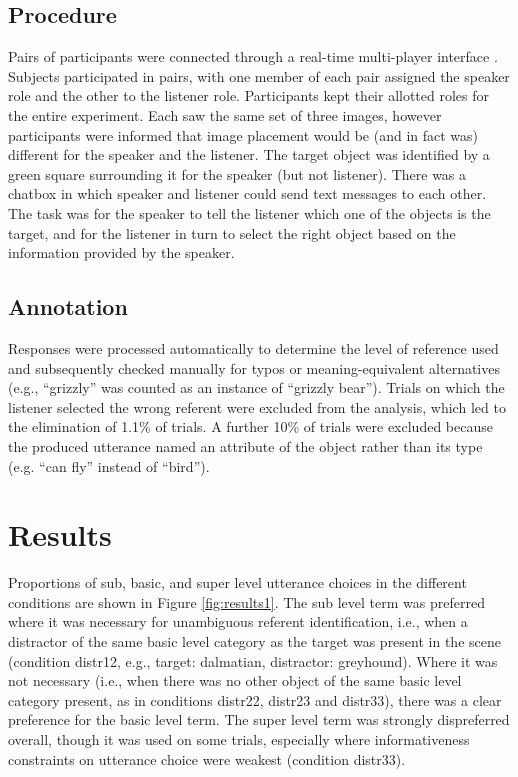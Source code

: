 \documentclass[10pt,letterpaper]{article}
\newcommand{\ndg}[1]{\textcolor{Green}{[ndg: #1]}}
\newcommand{\figref}[1]{Figure \ref{#1}}
\begin{document}
\subsection{\bf Procedure}
Pairs of participants were connected through a real-time multi-player interface \cite{Hawkins15_RealTimeWebExperiments}. Subjects participated in pairs, with one member of each pair assigned the speaker role and the other to the listener role. Participants kept their allotted roles for the entire experiment. 
Each saw the same set of three images, however participants were informed that image placement would be (and in fact was) different for the speaker and the listener. The target object was identified by a green square surrounding it for the speaker (but not listener). There was a chatbox in which speaker and listener could send text messages to each other. The task was for the speaker to tell the listener which one of the objects is the target, and for the listener in turn to select the right object based on the information provided by the speaker. 

\subsection{\bf Annotation}
Responses were processed automatically to determine the level of reference used and subsequently checked manually for typos or meaning-equivalent alternatives (e.g., ``grizzly'' was counted as an instance of ``grizzly bear''). 
Trials on which the listener selected the wrong referent were excluded from the analysis, which led to the elimination of 1.1\% of trials. A further 10\% of trials were excluded because  the produced utterance named an attribute of the object rather than its type (e.g. ``can fly'' instead of ``bird'').

\section{\bf Results}

Proportions of sub, basic, and super level utterance choices in the different conditions are shown in \figref{fig:results1}. The sub level term was preferred where it was necessary for unambiguous referent identification, i.e., when a distractor of the same basic level category as the target was present in the scene (condition distr12, e.g., target: dalmatian, distractor: greyhound). Where it was not necessary (i.e., when there was no other object of the same basic level category present, as in conditions distr22, distr23 and distr33), there was a clear preference for the basic level term. The super level term was strongly dispreferred overall, though it was used on some trials, especially where informativeness constraints on utterance choice were weakest (condition distr33). 
\end{document}
